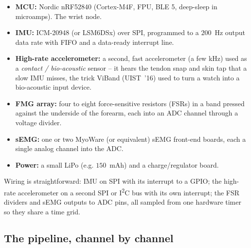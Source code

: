 \begin{itemize}
  \item \textbf{MCU:} Nordic nRF52840 (Cortex-M4F, FPU, BLE 5, deep-sleep in microamps). The wrist
    node.
  \item \textbf{IMU:} ICM-20948 (or LSM6DSx) over SPI, programmed to a $200$~Hz output data rate
    with FIFO and a data-ready interrupt line.
  \item \textbf{High-rate accelerometer:} a second, fast accelerometer (a few kHz) used as a
    \emph{contact / bio-acoustic} sensor -- it hears the tendon snap and skin tap that a slow IMU
    misses, the trick ViBand (UIST~'16) used to turn a watch into a bio-acoustic input device.
  \item \textbf{FMG array:} four to eight force-sensitive resistors (FSRs) in a band pressed against
    the underside of the forearm, each into an ADC channel through a voltage divider.
  \item \textbf{sEMG:} one or two MyoWare (or equivalent) sEMG front-end boards, each a single
    analog channel into the ADC.
  \item \textbf{Power:} a small LiPo (e.g. $150$~mAh) and a charge/regulator board.
\end{itemize}

Wiring is straightforward: IMU on SPI with its interrupt to a GPIO; the high-rate accelerometer on a
second SPI or I\textsuperscript{2}C bus with its own interrupt; the FSR dividers and sEMG outputs to
ADC pins, all sampled from one hardware timer so they share a time grid.

\subsection{The pipeline, channel by channel}


